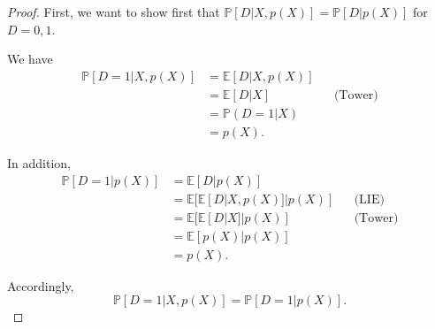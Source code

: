 \documentclass[11pt,a4paper]{amsart}
\theoremstyle{plain}
\theoremstyle{definition}
\begin{document}
	\begin{proof}
		First, we want to show first that $\mathbb{P}[D|X,p(X)] = \mathbb{P}[D|p(X)] $ for $D=0,1$.\par 
		 We have 
		\[	\begin{aligned}
			\mathbb{P}[D=1 | X, p(X)] &= \mathbb{E}[D|  X, p(X)]	\\
			&= \mathbb{E}[D|X] &&\text{(Tower)}	\\
			&= \mathbb{P}(D=1|X)	\\
			&= p(X).
		\end{aligned}	\]
		
		In addition,
		\[	\begin{aligned}
			\mathbb{P}[D=1 | p(X)] &=  \mathbb{E}[D|  p(X)]	\\
			&= \mathbb{E}[\mathbb{E}[D|X, p(X)]|p(X)]	&&\text{(LIE)}\\
			&= \mathbb{E}[\mathbb{E}[D|X]|p(X)]	&&\text{(Tower)}\\
			&= \mathbb{E}[p(X)|p(X)]	\\
			&= p(X).
		\end{aligned}	\]
		
		Accordingly,
		\[	\mathbb{P}[D=1 | X, p(X)] = \mathbb{P}[D=1 | p(X)].	\]
		

\end{proof}
\end{document}
